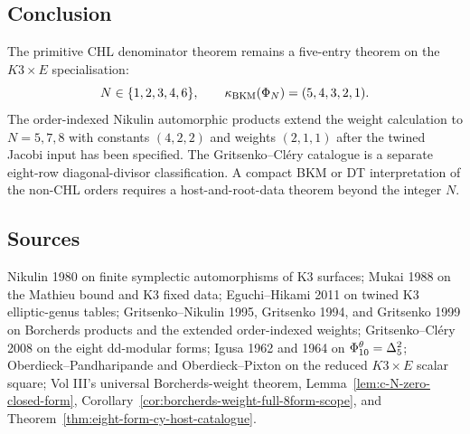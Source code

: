 \subsection*{Conclusion}

The primitive CHL denominator theorem remains a five-entry theorem on
the $K3\times E$ specialisation:
\[
  N\in\{1,2,3,4,6\},\qquad
  \kappa_{\mathrm{BKM}}(\Phi_N)=(5,4,3,2,1).
\]
The order-indexed Nikulin automorphic products extend the weight
calculation to $N=5,7,8$ with constants $(4,2,2)$ and weights
$(2,1,1)$ after the twined Jacobi input has been specified. The
Gritsenko--Cl\'ery catalogue is a separate eight-row
diagonal-divisor classification. A compact BKM or DT interpretation of
the non-CHL orders requires a host-and-root-data theorem beyond the
integer $N$.

\subsection*{Sources}

Nikulin 1980 on finite symplectic automorphisms of K3 surfaces;
Mukai 1988 on the Mathieu bound and K3 fixed data; Eguchi--Hikami
2011 on twined K3 elliptic-genus tables; Gritsenko--Nikulin 1995,
Gritsenko 1994, and Gritsenko 1999 on Borcherds products and the
extended order-indexed weights; Gritsenko--Cl\'ery 2008 on the eight
dd-modular forms; Igusa 1962 and 1964 on $\Phi_{10}^\theta=\Delta_5^2$;
Oberdieck--Pandharipande and Oberdieck--Pixton on the reduced
$K3\times E$ scalar square; Vol III's universal Borcherds-weight
theorem,
Lemma~\ref{lem:c-N-zero-closed-form},
Corollary~\ref{cor:borcherds-weight-full-8form-scope}, and
Theorem~\ref{thm:eight-form-cy-host-catalogue}.
